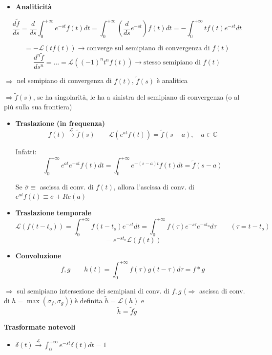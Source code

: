 \documentclass[11pt,a4paper]{report}
\begin{document}
\begin{itemize}
    \item \textbf{Analiticità}
\end{itemize}
\[ \frac{d\tilde{f}}{ds} = \frac{d}{ds} \int_0^{+\infty} e^{-st} f(t) dt = \int_0^{+\infty} \left( \frac{d}{ds} e^{-st} \right) f(t) dt = - \int_0^{+\infty} t f(t) e^{-st} dt \]


\[ = -\mathcal{L}(t f(t)) \rightarrow \text{converge sul semipiano di convergenza di } f(t) \]
\[ \frac{d^n\tilde{f}}{ds^n} = \dots = \mathcal{L}((-1)^n t^n f(t)) \rightarrow \text{stesso semipiano di } f(t) \]

$\Rightarrow$ nel semipiano di convergenza di $f(t)$, $\tilde{f}(s)$ è analitica

$\Rightarrow \tilde{f}(s)$, se ha singolarità, le ha a sinistra del semipiano di convergenza (o al più sulla sua frontiera)

\begin{itemize}
    \item \textbf{Traslazione (in frequenza)}
    \[ f(t) \xrightarrow{\mathcal{L}} \tilde{f}(s) \qquad \mathcal{L}(e^{at} f(t)) = \tilde{f}(s-a), \quad a \in \mathbb{C} \]
    
    Infatti:
    \[ \int_0^{+\infty} e^{at} e^{-st} f(t) dt = \int_0^{+\infty} e^{-(s-a)t} f(t) dt = \tilde{f}(s-a) \]
    
    Se $\overline{\sigma} \equiv$ ascissa di conv. di $f(t)$, allora l'ascissa di conv. di $e^{at} f(t) \equiv \overline{\sigma} + Re(a)$
    
    \item \textbf{Traslazione temporale}
    \[ \mathcal{L}(f(t-t_o)) = \int_0^{+\infty} f(t-t_o) e^{-st} dt = \int_0^{+\infty} f(\tau) e^{-s\tau} e^{-st_o} d\tau \qquad (\tau = t - t_o) \]
    \[ = e^{-st_o} \mathcal{L}(f(t)) \]
    
    \item \textbf{Convoluzione}
    \[ f, g \qquad h(t) = \int_0^{+\infty} f(\tau) g(t-\tau) d\tau = f * g \]
\end{itemize}


$\Rightarrow$ sul semipiano intersezione dei semipiani di conv. di $f, g$ ($\Rightarrow$ ascissa di conv. di $h = \max(\sigma_f, \sigma_g)$) è definita $\tilde{h} = \mathcal{L}(h)$ e 
\[ \tilde{h} = \tilde{f} \tilde{g} \]

\textbf{Trasformate notevoli}
\begin{itemize}
    \item $\delta(t) \xrightarrow{\mathcal{L}} \int_0^{+\infty} e^{-st} \delta(t) dt = 1$
\end{itemize}
\end{document}
